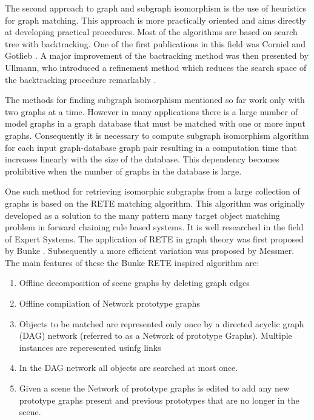 The second approach to graph and subgraph isomorphism is the use of heuristics for graph matching. This approach is more practically oriented and aims 
directly at developing practical procedures. Most of the algorithms are based on search tree with backtracking. One of the first publications in this 
field was Corniel and Gotlieb \cite{corneil1970}. A major improvement of the bactracking method was then presented by Ullmann, who introduced  a refinement 
method which reduces the search space of the backtracking procedure remarkably \cite{ullmann1976}.

The methods for finding subgraph isomorphism mentioned so far work only with two graphs at a time. However in many applications there is a large number of model graphs in a graph database that must be matched with one or more input graphs. Consequently it is necessary to compute subgraph isomorphism algorithm for each input graph-database graph pair resulting in a computation time that increases linearly with the size of the database. This dependency becomes prohibitive when the number of graphs in the database is large.  


One such method for retrieving  isomorphic subgraphs from a large collection of graphs is based on the RETE \cite{forgy1982} matching algorithm. This algorithm was originally developed as a solution to the many pattern many target object matching problem in forward chaining rule based systems. It is well researched in the field of Expert Systems. The application of RETE in graph theory was first proposed by Bunke \cite{bunke_glauser_tran1991}. Subsequently a more efficient variation was proposed by Messmer\cite{messmer_bunke2000}. The main features of these the Bunke RETE inspired algorithm are: 

\begin{enumerate}
\item Offline decomposition of scene graphs by deleting graph edges
\item Offline compilation of Network prototype graphs
\item Objects to be matched are represented only once by a directed acyclic graph (DAG) network (referred to as a Network of prototype Graphs). Multiple instances are reperesented usinfg links
\item In the DAG network  all objects are searched at most  once.
\item Given a scene the Network of prototype graphs is edited to add any new prototype graphs present and previous prototypes that are no longer in the scene.
\end{enumerate}
 
